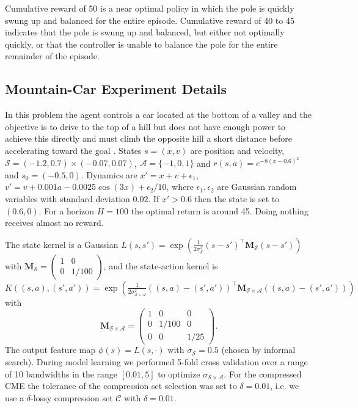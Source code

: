 \documentclass[letterpaper]{article}
\newcommand{\SinghEligibility}{DBLP:journals/ml/SinghS96}
\newcommand{\cC}{{\mathcal C}}
\newcommand{\cA}{{\mathcal A}}
\newcommand{\cS}{{\mathcal S}}
\newcommand{\bM}{{\bm M}}
\begin{document}
Cumulative reward of 50 is a near optimal policy in which the pole is quickly swung up and balanced for the entire episode. Cumulative reward of 40 to 45 indicates that the pole is swung up and balanced, but either not optimally quickly, or that the controller is unable to balance the pole for the entire remainder of the episode. 

\subsection{Mountain-Car Experiment Details}

In this problem the agent controls a car located at the bottom of a valley and the objective is to drive to the top of a hill but does not have enough power to achieve this directly and must climb the opposite hill a short distance before accelerating toward the goal \cite[see e.g.][]{\SinghEligibility}. States $s =(x,v)$ are position and velocity, $\cS=(-1.2,0.7)\times(-0.07,0.07)$, $\cA=\{-1,0,1\}$ and $r(s,a) = e^{-8(x-0.6)^2} $ and $s_0 = (-0.5,0)$. Dynamics are $x' = x+v+\epsilon_1$, $v' = v + 0.001a -0.0025 \cos(3 x) + \epsilon_2/10$, where $\epsilon_1, \epsilon_2$ are Gaussian random variables with standard deviation $0.02$. If $x'>0.6$ then the state is set to $(0.6,0)$. For a horizon $H=100$ the optimal return is around 45. Doing nothing receives almost no reward. 

The state kernel is a Gaussian $L(s,s') = \exp\left({\frac{1}{2\sigma_{\cS}^2}(s - s')^\top \bM_\cS (s - s')}\right)$ with $\bM_\cS =\left( \begin{array}{cc}
1 & 0 \\
0 & 1/100  \end{array} \right)$, and the state-action kernel is  $K((s,a),(s',a')) = \exp\left({\frac{1}{2\sigma_{\cS\times\cA}^2}((s,a) - (s',a'))^\top \bM_{\cS\times\cA} ((s,a) - (s',a'))}\right)$ with
$$\bM_{\cS\times\cA} =\left( \begin{array}{ccc}
1 & 0 & 0\\
0 & 1/100 & 0\\
0 & 0 & 1/25\end{array} \right).$$ The output feature map $\phi(s) = L(s,\cdot)$ with $\sigma_{\cS} = 0.5$ (chosen by informal search). During model learning we performed 5-fold cross validation over a range of 10 bandwidths in the range $[0.01,5]$ to optimize $\sigma_{\cS\times\cA}$. For the compressed CME the tolerance of the compression set selection was set to $\delta = 0.01$, i.e. we use a $\delta$-lossy compression set $\cC$ with $\delta=0.01$.
\end{document}
